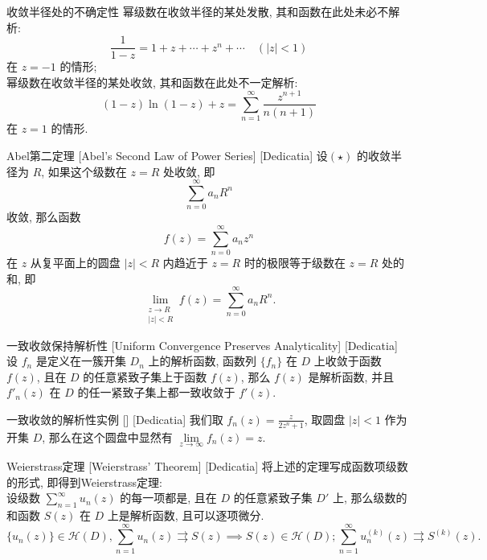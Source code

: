 \documentclass[UTF8]{ctexart}
\begin{document}
        \begin{cxmp}
            {收敛半径处的不确定性}
            幂级数在收敛半径的某处发散, 其和函数在此处未必不解析: 
            \[\frac{1}{1-z}=1+z+\cdots+z^n+\cdots\quad(|z|<1) \]
            在 \(z=-1\) 的情形; \\
            幂级数在收敛半径的某处收敛, 其和函数在此处不一定解析: 
            \[(1-z)\ln(1-z)+z=\sum_{n=1}^{\infty}\frac{z^{n+1}}{n(n+1)}\]
            在 \(z=1\) 的情形. 
        \end{cxmp}

        \begin{thm}
            [UUID]
            {Abel第二定理}
            [Abel's Second Law of Power Series]
            [Dedicatia]
            设\PowerSeries  \((\star)\) 的收敛半径为 \(R\), 如果这个级数在 \(z = R\) 处收敛, 即
            \[\sum_{n=0}^{\infty} a_n R^n\]
            收敛, 那么函数
            \[f(z) = \sum_{n=0}^{\infty} a_n z^n\]
            在 \(z\) 从复平面上的圆盘 \(|z| < R\) 内趋近于 \(z = R\) 时的极限等于级数在 \(z = R\) 处的和, 即
            \[\lim_{\substack{z \to R \\ |z| < R}} f(z) = \sum_{n=0}^{\infty} a_n R^n.\]
        \end{thm}

        \begin{thm}
            [UUID]
            {一致收敛保持解析性}
            [Uniform Convergence Preserves Analyticality]
            [Dedicatia]
            设 \(f_n\) 是定义在一簇开集 \(D_n\) 上的解析函数, 函数列 \(\{f_n\}\) 在 \(D\) 上收敛于函数 \(f(z)\), 且在 \(D\) 的任意紧致子集上 于函数 \(f(z)\), 那么 \(f(z)\) 是解析函数, 并且 \(f'_n(z)\) 在 \(D\) 的任一紧致子集上都一致收敛于 \(f'(z)\).
        \end{thm}

        \begin{xmp}
            [UUID]
            {一致收敛的解析性实例}
            []
            [Dedicatia]
            我们取 \(f_n(z)=\frac{z}{2z^n+1}\), 取圆盘 \(|z|<1\) 作为开集 \(D\), 那么在这个圆盘中显然有 \(\lim\limits_{z\to\infty}f_n(z)=z\).
        \end{xmp}

        \begin{thm}
            [UUID]
            {Weierstrass定理}
            [Weierstrass' Theorem]
            [Dedicatia]
            将上述的定理写成函数项级数的形式, 即得到Weierstrass定理: \\
            设级数 \(\sum_{n = 1}^{\infty} u_n(z)\) 的每一项都是, 且在 \(D\) 的任意紧致子集 \(D'\) 上, 那么级数的和函数 \(S(z)\) 在 \(D\) 上是解析函数, 且可以逐项微分. 
            \[\{u_n(z)\}\in\mathcal{H}(D),\sum_{n = 1}^{\infty} u_n(z)\rightrightarrows S(z)\implies S(z)\in\mathcal{H}(D); \sum_{n = 1}^{\infty} u_n^{(k)}(z)\rightrightarrows S^{(k)}(z).\]
        \end{thm}
\end{document}
